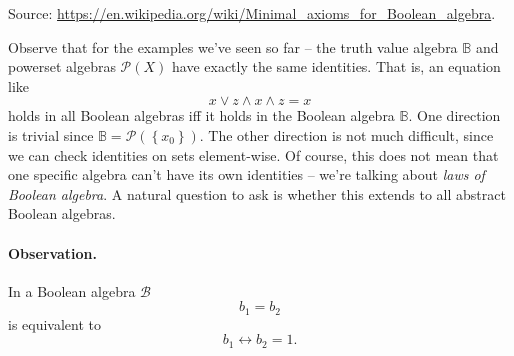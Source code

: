 
Source: \url{https://en.wikipedia.org/wiki/Minimal_axioms_for_Boolean_algebra}.

Observe that for the examples we've seen so far -- the truth value algebra \( \mathbb{B} \) and powerset algebras \( \mathcal{P}(X) \) have exactly the same identities. That is, an equation like
\[ 
    x \vee z \wedge x \wedge z = x 
\]
holds in all Boolean algebras iff it holds in the Boolean algebra \( \mathbb{B} \). One direction is trivial since \( \mathbb{B} = \mathcal{P}( \left\{  x_0 \right\} ) \). The other direction is not much difficult, since we can check identities on sets element-wise. Of course, this does not mean that one specific algebra can't have its own identities -- we're talking about \emph{laws of Boolean algebra}. A natural question to ask is whether this extends to all abstract Boolean algebras.
\paragraph{Observation.} In a Boolean algebra \( \mathcal{B} \)
\[ 
    b_1 = b_2 
\]
is equivalent to
\[ 
    b_1 \leftrightarrow b_2 = 1. 
\]

